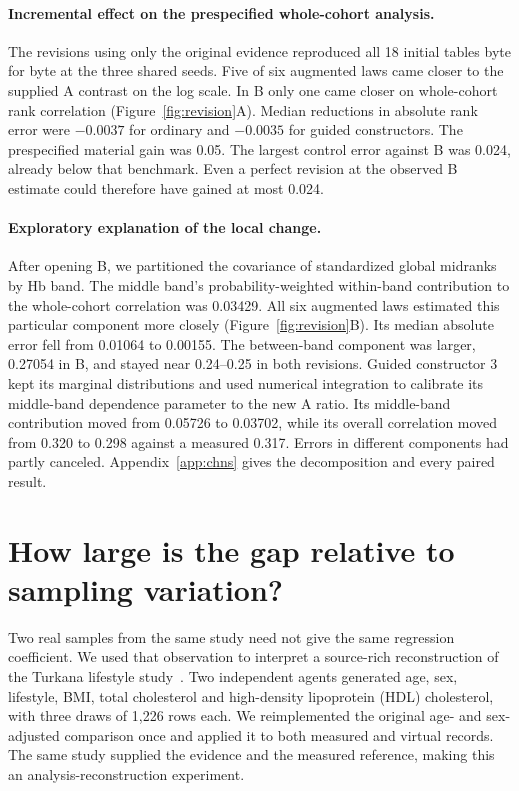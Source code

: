\documentclass[sigconf,anonymous,review]{acmart}
\begin{document}
\paragraph{Incremental effect on the prespecified whole-cohort analysis.}
The revisions using only the original evidence reproduced all 18 initial tables byte for byte at the three shared seeds. Five of six augmented laws came closer to the supplied A contrast on the log scale. In B only one came closer on whole-cohort rank correlation (Figure~\ref{fig:revision}A). Median reductions in absolute rank error were $-0.0037$ for ordinary and $-0.0035$ for guided constructors. The prespecified material gain was 0.05. The largest control error against B was 0.024, already below that benchmark. Even a perfect revision at the observed B estimate could therefore have gained at most 0.024.

\paragraph{Exploratory explanation of the local change.}
After opening B, we partitioned the covariance of standardized global midranks by Hb band. The middle band's probability-weighted within-band contribution to the whole-cohort correlation was 0.03429. All six augmented laws estimated this particular component more closely (Figure~\ref{fig:revision}B). Its median absolute error fell from 0.01064 to 0.00155. The between-band component was larger, 0.27054 in B, and stayed near 0.24--0.25 in both revisions. Guided constructor 3 kept its marginal distributions and used numerical integration to calibrate its middle-band dependence parameter to the new A ratio. Its middle-band contribution moved from 0.05726 to 0.03702, while its overall correlation moved from 0.320 to 0.298 against a measured 0.317. Errors in different components had partly canceled. Appendix~\ref{app:chns} gives the decomposition and every paired result.

\section{How large is the gap relative to sampling variation?}
\label{sec:lifestyle}
Two real samples from the same study need not give the same regression coefficient. We used that observation to interpret a source-rich reconstruction of the Turkana lifestyle study~\cite{lea,leadata}. Two independent agents generated age, sex, lifestyle, BMI, total cholesterol and high-density lipoprotein (HDL) cholesterol, with three draws of 1,226 rows each. We reimplemented the original age- and sex-adjusted comparison once and applied it to both measured and virtual records. The same study supplied the evidence and the measured reference, making this an analysis-reconstruction experiment.
\end{document}
